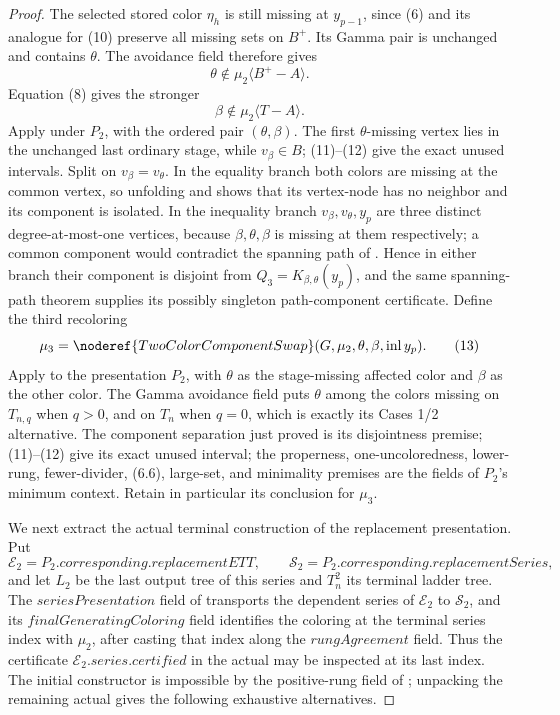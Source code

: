 \begin{proof}
The selected stored color \(\eta_h\) is still missing at
\(y_{p-1}\), since (6) and its analogue for (10) preserve all missing
sets on \(B^+\).  Its Gamma pair is unchanged and contains \(\theta\).
The avoidance field therefore gives
\[
 \theta\notin\mu_2\langle B^+-A\rangle.                      \tag{11}
\]
Equation (8) gives the stronger
\[
 \beta\notin\mu_2\langle T-A\rangle.                         \tag{12}
\]
Apply  under \(P_2\), with the ordered pair
\((\theta,\beta)\).  The first \(\theta\)-missing vertex lies in the
unchanged last ordinary stage, while \(v_\beta\in B\); (11)--(12) give
the exact unused intervals.  Split on \(v_\beta=v_\theta\).  In the
equality branch both colors are missing at the common vertex, so
unfolding  and
 shows that its vertex-node has no
neighbor and its component is isolated.  In the inequality branch
\(v_\beta,v_\theta,y_p\) are three distinct degree-at-most-one vertices,
because \(\beta,\theta,\beta\) is missing at them respectively; a common
component would contradict the spanning path of
.  Hence in either branch their
component is disjoint from \(Q_3=K_{\beta,\theta}(y_p)\), and the same
spanning-path theorem supplies its possibly singleton path-component
certificate.  Define the third recoloring
\[
 \mu_3=\noderef{TwoColorComponentSwap}
        (G,\mu_2,\theta,\beta,\operatorname{inl}y_p).         \tag{13}
\]
Apply  to the presentation \(P_2\),
with \(\theta\) as the stage-missing affected color and \(\beta\) as
the other color.  The Gamma avoidance field puts \(\theta\) among the
colors missing on \(T_{n,q}\) when \(q>0\), and on \(T_n\) when \(q=0\),
which is exactly its Cases 1/2 alternative.  The component separation just proved is its
disjointness premise; (11)--(12) give its exact unused interval; the
properness, one-uncoloredness, lower-rung, fewer-divider, (6.6),
large-set, and minimality premises are the fields of \(P_2\)'s minimum
context.  Retain in particular its
 conclusion for \(\mu_3\).

We next extract the actual terminal construction of the replacement
presentation.  Put
\[
 \mathcal E_2=P_2.\mathit{corresponding}.\mathit{replacementETT},
 \qquad
 \mathcal S_2=P_2.\mathit{corresponding}.\mathit{replacementSeries},
\]
and let \(L_2\) be the last output tree of this series and \(T_n^2\) its
terminal ladder tree.  The \(\mathit{seriesPresentation}\) field of
 transports the dependent
series of \(\mathcal E_2\) to \(\mathcal S_2\), and its
\(\mathit{finalGeneratingColoring}\) field identifies the coloring at the
terminal series index with \(\mu_2\), after casting that index along the
\(\mathit{rungAgreement}\) field.  Thus the certificate
\(\mathcal E_2.\mathit{series}.\mathit{certified}\) in the actual
 may be inspected at its last index.  The
initial constructor is impossible by the positive-rung field of
; unpacking the remaining actual
 gives the following exhaustive alternatives.


\end{proof}
